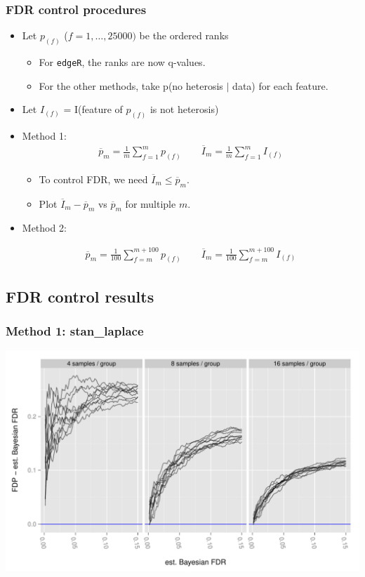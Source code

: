 \documentclass[handout]{beamer}
\providecommand{\ov}[1]{\overline{#1}}
\numberwithin{equation}{section}
\begin{document}
\begin{frame}
\frametitle{FDR control procedures}

\begin{itemize}
\item Let $p_{(f)}$ ($f = 1, \ldots, 25000)$ be the ordered ranks 
\begin{itemize}
\item For {\tt edgeR}, the ranks are now q-values.
\item For the other methods, take p(no heterosis $|$ data) for each feature.
\end{itemize}
\pause \item Let $I_{(f)}$ = I(feature of $p_{(f)}$ is not heterosis)
\item Method 1:
\begin{align*}
\ov{p}_m = \frac{1}{m} \sum_{f = 1}^m p_{(f)} \qquad \ov{I}_m = \frac{1}{m}\sum_{f = 1}^m I_{(f)}
\end{align*}
\begin{itemize}
\pause \item To control FDR, we need $\ov{I}_m \le \ov{p}_m$.
\item Plot $\ov{I}_m - \ov{p}_m$ vs $\ov{p}_m$ for multiple $m$.
\end{itemize}

\pause \item Method 2:

\begin{align*}
\ov{p}_m = \frac{1}{100} \sum_{f = m}^{m + 100} p_{(f)} \qquad \ov{I}_m = \frac{1}{100}\sum_{f = m}^{m + 100} I_{(f)}
\end{align*}
\end{itemize}
\end{frame}

\subsection{FDR control results}


\begin{frame}
\frametitle{Method 1: stan\_laplace}
\begin{center}
\includegraphics[scale=0.5]{../fig/fdr-indiv-dan-stan_laplace-subtract-no}
\end{center}
\end{frame}
\end{document}
